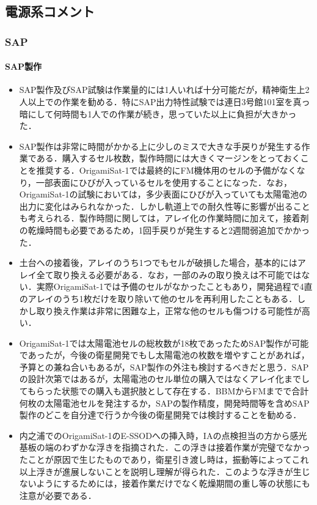\subsection{電源系コメント}

\subsubsection{SAP}
\paragraph{SAP製作}
\begin{itemize}
	\item SAP製作及びSAP試験は作業量的には1人いれば十分可能だが，精神衛生上2人以上での作業を勧める．特にSAP出力特性試験では連日3号館101室を真っ暗にして何時間も1人での作業が続き，思っていた以上に負担が大きかった．
	\item SAP製作は非常に時間がかかる上に少しのミスで大きな手戻りが発生する作業である．購入するセル枚数，製作時間には大きくマージンをとっておくことを推奨する．OrigamiSat-1では最終的にFM機体用のセルの予備がなくなり，一部表面にひびが入っているセルを使用することになった．なお，OrigamiSat-1の試験においては，多少表面にひびが入っていても太陽電池の出力に変化はみられなかった．しかし軌道上での耐久性等に影響が出ることも考えられる．製作時間に関しては，アレイ化の作業時間に加えて，接着剤の乾燥時間も必要であるため，1回手戻りが発生すると2週間弱追加でかかった．
	\item 土台への接着後，アレイのうち1つでもセルが破損した場合，基本的にはアレイ全て取り換える必要がある．なお，一部のみの取り換えは不可能ではない．実際OrigamiSat-1では予備のセルがなかったこともあり，開発過程で4直のアレイのうち1枚だけを取り除いて他のセルを再利用したこともある．しかし取り換え作業は非常に困難な上，正常な他のセルも傷つける可能性が高い．
	\item OrigamiSat-1では太陽電池セルの総枚数が18枚であったためSAP製作が可能であったが，今後の衛星開発でもし太陽電池の枚数を増やすことがあれば，予算との兼ね合いもあるが，SAP製作の外注も検討するべきだと思う．SAPの設計次第ではあるが，太陽電池のセル単位の購入ではなくアレイ化までしてもらった状態での購入も選択肢として存在する．BBMからFMまでで合計何枚の太陽電池セルを発注するか，SAPの製作精度，開発時間等を含めSAP製作のどこを自分達で行うか今後の衛星開発では検討することを勧める．
	\item 内之浦でのOrigamiSat-1のE-SSODへの挿入時，IAの点検担当の方から感光基板の端のわずかな浮きを指摘された．この浮きは接着作業が完璧でなかったことが原因で生じたものであり，衛星引き渡し時は，振動等によってこれ以上浮きが進展しないことを説明し理解が得られた．このような浮きが生じないようにするためには，接着作業だけでなく乾燥期間の重し等の状態にも注意が必要である．
\end{itemize}
